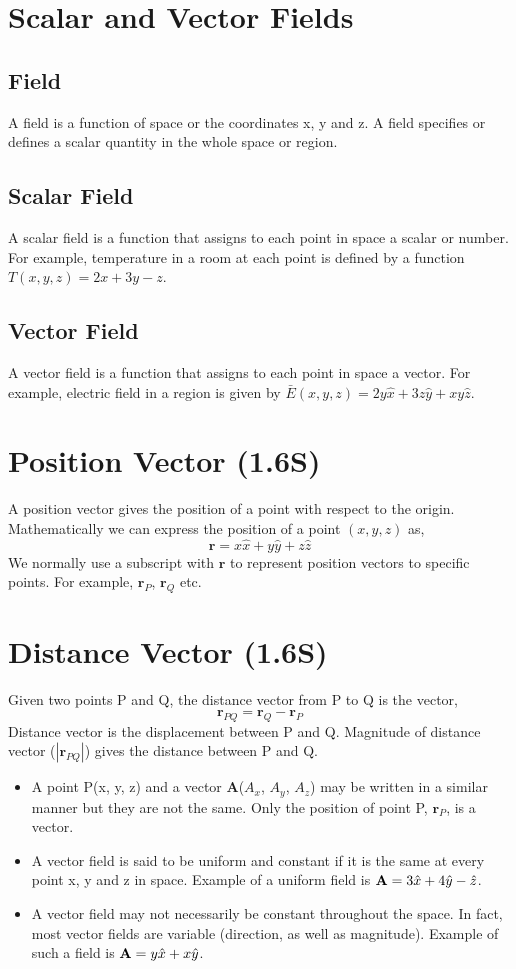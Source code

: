 \documentclass[12pt,a4paper]{article}
\begin{document}
\section{Scalar and Vector Fields}
\subsection{Field}
A field is a function of space or the coordinates x, y and z. A field specifies or defines a scalar quantity in the whole space or region.
\subsection{Scalar Field}
A scalar field is a function that assigns to each point in space a scalar or number. For example, temperature in a room at each point is defined by a function $T(x, y, z)=2x+3y-z$.
\subsection{Vector Field}
A vector field is a function that assigns to each point in space a vector. For example, electric field in a region is given by $\bar{E}(x, y, z)=2y\hat{x}+3z\hat{y}+xy\hat{z}$.
\section{Position Vector (1.6S)}
A position vector gives the position of a point with respect to the origin. Mathematically we can express the position of a point $(x,y,z)$ as,
\begin{equation}
\textbf{r}=x\hat x+y \hat y+z\hat z
\end{equation}
We normally use a subscript with $\textbf{r}$ to represent position vectors to specific points. For example, $\textbf{r}_P$, $\textbf{r}_Q$ etc.
\section{Distance Vector (1.6S)}
Given two points P and Q, the distance vector from P to Q is the vector,
\begin{equation}
\textbf{r}_{PQ}=\textbf{r}_{Q}-\textbf{r}_{P}
\end{equation}
Distance vector is the displacement between P and Q. Magnitude of distance vector ($|\textbf{r}_{PQ}|$) gives the distance between P and Q.

\begin{itemize}
\item A point P(x, y, z) and a vector \textbf{A}($A_x$, $A_y$, $A_z$) may be written in a similar manner but they are not the same. Only the position of point P, $\textbf{r}_P$, is a vector. \cite[page 8]{Sadiku}
\item A vector field is said to be uniform and constant if it is the same at every point x, y and z in space. Example of a uniform field is $\textbf A=3\hat x+4\hat y-\hat z$.
\item A vector field may not necessarily be constant throughout the space. In fact, most vector fields are variable (direction, as well as magnitude). Example of such a field is $\textbf A=y\hat x+x\hat y$.
\end{itemize}
\end{document}
